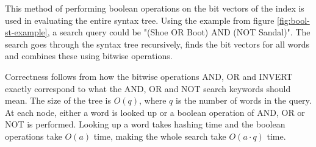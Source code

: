 This method of performing boolean operations on the bit vectors of the index is used in evaluating the entire syntax tree. Using the example from figure \ref{fig:bool-st-example}, a search query could be "(Shoe OR Boot) AND (NOT Sandal)". The search goes through the syntax tree recursively, finds the bit vectors for all words and combines these using bitwise operations.

Correctness follows from how the bitwise operations AND, OR and INVERT exactly correspond to what the AND, OR and NOT search keywords should mean. The size of the tree is $O(q)$, where $q$ is the number of words in the query. At each node, either a word is looked up or a boolean operation of AND, OR or NOT is performed. Looking up a word takes hashing time and the boolean operations take $O(a)$ time, making the whole search take $O(a\cdot q)$ time. 



